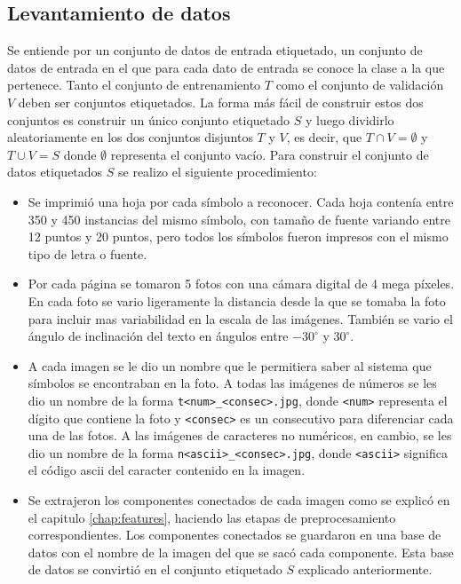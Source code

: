 \documentclass[a4paper, 11pt, oneside]{report}
\begin{document}
\subsection{Levantamiento de datos}
Se entiende por un conjunto de datos de entrada etiquetado, un conjunto de datos de entrada en el que para cada dato de entrada se conoce la clase a la que pertenece. Tanto el conjunto de entrenamiento $T$ como el conjunto de validación $V$ deben ser conjuntos etiquetados.
La forma más fácil de construir estos dos conjuntos es construir un único conjunto etiquetado $S$ y luego dividirlo aleatoriamente en los dos conjuntos disjuntos $T$ y $V$, es decir, que $T \cap V = \emptyset$ y $T \cup V = S$ donde $\emptyset$ representa el conjunto vacío.
Para construir el conjunto de datos etiquetados $S$ se realizo el siguiente procedimiento:
\begin{itemize}
\item Se imprimió una hoja por cada símbolo a reconocer. Cada hoja contenía entre 350 y 450 instancias del mismo símbolo, con tamaño de fuente variando entre 12 puntos y 20 puntos, pero todos los símbolos fueron impresos con el mismo tipo de letra o fuente.
\item Por cada página se tomaron 5 fotos con una cámara digital de 4 mega píxeles. En cada foto se vario ligeramente la distancia desde la que se tomaba la foto para incluir mas variabilidad en la escala de las imágenes. También se vario el ángulo de inclinación del texto en ángulos entre $-30^\circ$ y $30^\circ$.
\item A cada imagen se le dio un nombre que le permitiera saber al sistema que símbolos se encontraban en la foto. A todas las imágenes de números se les dio un nombre de la forma \verb/t<num>_<consec>.jpg/, donde \verb/<num>/ representa el dígito que contiene la foto y \verb/<consec>/ es un consecutivo para diferenciar cada una de las fotos. A las imágenes de caracteres no numéricos, en cambio, se les dio un nombre de la forma \verb/n<ascii>_<consec>.jpg/, donde \verb/<ascii>/ significa el código ascii del caracter contenido en la imagen.
\item Se extrajeron los componentes conectados de cada imagen como se explicó en el capitulo \ref{chap:features}, haciendo las etapas de preprocesamiento correspondientes. Los componentes conectados se guardaron en una base de datos con el nombre de la imagen del que se sacó cada componente. Esta base de datos se convirtió en el conjunto etiquetado $S$ explicado anteriormente.
\end{itemize}
\end{document}
